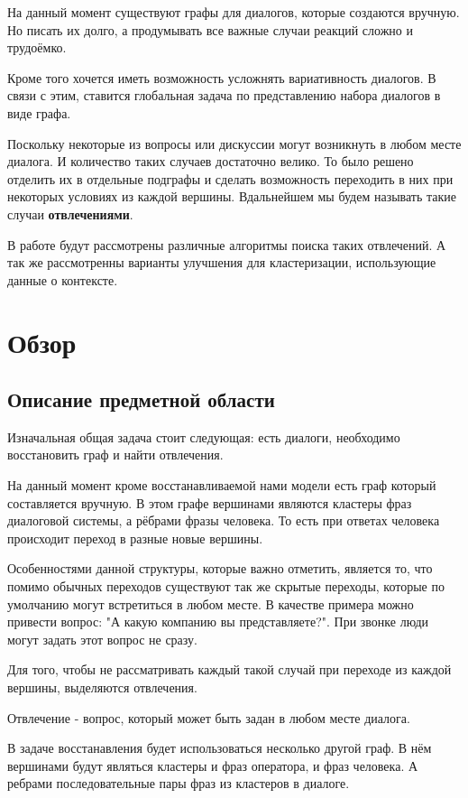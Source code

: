 \documentclass[specification,annotation]{itmo-student-thesis}
\begin{document}
	На данный момент существуют графы для диалогов, которые создаются вручную. Но писать их долго, а продумывать все важные случаи реакций сложно и трудоёмко. 
	
	Кроме того хочется иметь возможность усложнять вариативность диалогов. В связи с этим, ставится глобальная задача по представлению набора диалогов в виде графа. 
	
	Поскольку некоторые из вопросы или дискуссии могут возникнуть в любом месте диалога. И количество таких случаев достаточно велико. То было решено отделить их в отдельные подграфы и сделать возможность переходить в них при некоторых условиях из каждой вершины. Вдальнейшем мы будем называть такие случаи \textbf{отвлечениями}.
	
	В работе будут рассмотрены различные алгоритмы поиска таких отвлечений. А так же рассмотренны варианты улучшения для кластеризации, использующие данные о контексте.
	
	\chapter{Обзор}
	\section{Описание предметной области}
	Изначальная общая задача стоит следующая: есть диалоги, необходимо восстановить граф и найти отвлечения.
	
	На данный момент кроме восстанавливаемой нами модели есть граф который составляется вручную. В этом графе вершинами являются кластеры фраз диалоговой системы, а рёбрами фразы человека. То есть при ответах человека происходит переход в разные новые вершины.
	
	Особенностями данной структуры, которые важно отметить, является то, что помимо обычных переходов существуют так же скрытые переходы, которые по умолчанию могут встретиться в любом месте. В качестве примера можно привести вопрос: "А какую компанию вы представляете?". При звонке люди могут задать этот вопрос не сразу.
	
	Для того, чтобы не рассматривать каждый такой случай при переходе из каждой вершины, выделяются $\textbf{отвлечения}$. 
	
	$\textbf{Отвлечение}$ - вопрос, который может быть задан в любом месте диалога. 
	
	В задаче восстанавления будет использоваться несколько другой граф. В нём вершинами будут являться кластеры и фраз оператора, и фраз человека. А ребрами последовательные пары фраз из кластеров в диалоге.
	
\end{document}
